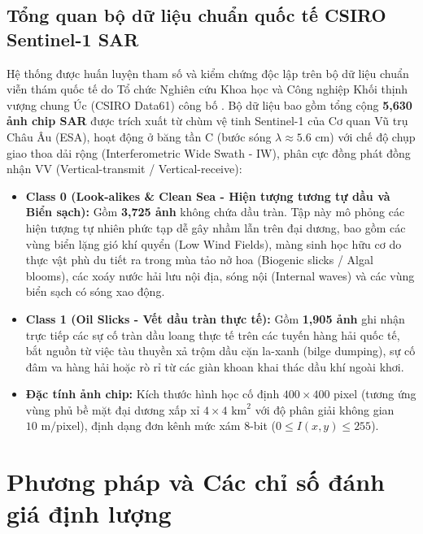 \subsection{Tổng quan bộ dữ liệu chuẩn quốc tế CSIRO Sentinel-1 SAR}
Hệ thống được huấn luyện tham số và kiểm chứng độc lập trên bộ dữ liệu chuẩn viễn thám quốc tế do Tổ chức Nghiên cứu Khoa học và Công nghiệp Khối thịnh vượng chung Úc (CSIRO Data61) công bố \cite{csiro2020sar}. Bộ dữ liệu bao gồm tổng cộng \textbf{5,630 ảnh chip SAR} được trích xuất từ chùm vệ tinh Sentinel-1 của Cơ quan Vũ trụ Châu Âu (ESA), hoạt động ở băng tần C (bước sóng $\lambda \approx 5.6$ cm) với chế độ chụp giao thoa dải rộng (Interferometric Wide Swath - IW), phân cực đồng phát đồng nhận VV (Vertical-transmit / Vertical-receive):
\begin{itemize}
    \item \textbf{Class 0 (Look-alikes \& Clean Sea - Hiện tượng tương tự dầu và Biển sạch):} Gồm \textbf{3,725 ảnh} không chứa dầu tràn. Tập này mô phỏng các hiện tượng tự nhiên phức tạp dễ gây nhầm lẫn trên đại dương, bao gồm các vùng biển lặng gió khí quyển (Low Wind Fields), màng sinh học hữu cơ do thực vật phù du tiết ra trong mùa tảo nở hoa (Biogenic slicks / Algal blooms), các xoáy nước hải lưu nội địa, sóng nội (Internal waves) và các vùng biển sạch có sóng xao động.
    \item \textbf{Class 1 (Oil Slicks - Vết dầu tràn thực tế):} Gồm \textbf{1,905 ảnh} ghi nhận trực tiếp các sự cố tràn dầu loang thực tế trên các tuyến hàng hải quốc tế, bắt nguồn từ việc tàu thuyền xả trộm dầu cặn la-xanh (bilge dumping), sự cố đâm va hàng hải hoặc rò rỉ từ các giàn khoan khai thác dầu khí ngoài khơi.
    \item \textbf{Đặc tính ảnh chip:} Kích thước hình học cố định $400 \times 400$ pixel (tương ứng vùng phủ bề mặt đại dương xấp xỉ $4 \times 4 \text{ km}^2$ với độ phân giải không gian $10 \text{ m/pixel}$), định dạng đơn kênh mức xám 8-bit ($0 \le I(x, y) \le 255$).
\end{itemize}

\section{Phương pháp và Các chỉ số đánh giá định lượng}
\label{sec:metrics}

